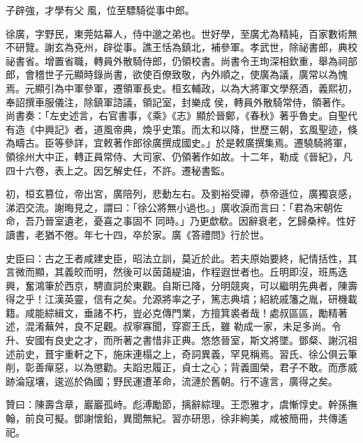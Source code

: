 \begin{pinyinscope}
 子辟強，才學有父
 風，位至驃騎從事中郎。



 徐廣，字野民，東莞姑幕人，侍中邈之弟也。世好學，至廣尤為精純，百家數術無不研覽。謝玄為兗州，辟從事。譙王恬為鎮北，補參軍。孝武世，除祕書郎，典校祕書省。增置省職，轉員外散騎侍郎，仍領校書。尚書令王珣深相欽重，舉為祠部郎，會稽世子元顯時錄尚書，欲使百僚致敬，內外順之，使廣為議，廣常以為愧焉。元顯引為中軍參軍，遷領軍長史。桓玄輔政，以為大將軍文學祭酒，義熙初，奉詔撰車服儀注，除鎮軍諮議，領記室，封樂成
 侯，轉員外散騎常侍，領著作。尚書奏：「左史述言，右官書事，《乘》《志》顯於晉鄭，《春秋》著乎魯史。自聖代有造《中興記》者，道風帝典，煥乎史策。而太和以降，世歷三朝，玄風聖迹，倏為疇古。臣等參詳，宜敕著作郎徐廣撰成國史。」於是敕廣撰集焉。遷驍騎將軍，領徐州大中正，轉正員常侍、大司家、仍領著作如故。十二年，勒成《晉紀》，凡四十六卷，表上之。因乞解史任，不許。遷秘書監。



 初，桓玄篡位，帝出宮，廣陪列，悲動左右。及劉裕受禪，恭帝遜位，廣獨哀感，涕泗交流。謝晦見之，謂曰：「徐公將無小過也。」廣收淚而言曰：「君為宋朝佐命，吾乃晉室遺老，憂喜之事固不
 同時。」乃更歔欷。因辭衰老，乞歸桑梓。性好讀書，老猶不倦。年七十四，卒於家。廣《答禮問》行於世。



 史臣曰：古之王者咸建史臣，昭法立訓，莫近於此。若夫原始要終，紀情括性，其言微而顯，其義皎而明，然後可以茵藹緹油，作程遐世者也。丘明即沒，班馬迭興，奮鴻筆於西京，騁直詞於東觀。自斯已降，分明競爽，可以繼明先典者，陳壽得之乎！江漢英靈，信有之矣。允源將率之子，篤志典墳；紹統戚籓之胤，研機載籍。咸能綜緝文，垂諸不朽，豈必克傳門業，方擅箕裘者哉！處叔區區，勵精著述，混淆蕪舛，良不足觀。叔寧寡聞，穿窬王氏，雖
 勒成一家，未足多尚。令升、安國有良史之才，而所著之書惜非正典。悠悠晉室，斯文將墜。鄧粲、謝沉祖述前史，葺宇重軒之下，施床連榻之上，奇詞異義，罕見稱焉。習氏、徐公俱云筆削，彰善癉惡，以為懲勸。夫蹈忠履正，貞士之心；背義圖榮，君子不敢。而彥威跡淪寇壤，逡巡於偽國；野民運遭革命，流漣於舊朝。行不違言，廣得之矣。



 贊曰：陳壽含章，巖巖孤峙。彪溥勵節，摛辭綜理。王恧雅才，虞慚惇史。幹孫撫翰，前良可擬。鄧謝懷鉛，異聞無紀。習亦研思，徐非絢美，咸被簡冊，共傳遙祀。



\end{pinyinscope}